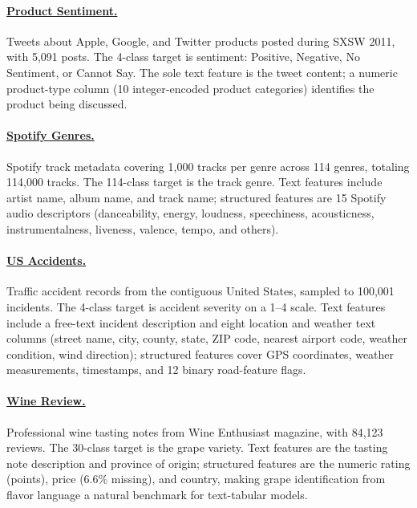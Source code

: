 \documentclass{llmxive}
\begin{document}
\paragraph{\href{https://www.openml.org/search?type=data&id=46651}{Product Sentiment.}} Tweets about Apple, Google, and Twitter products posted during SXSW 2011, with 5,091 posts.
The 4-class target is sentiment: Positive, Negative, No Sentiment, or Cannot Say.
The sole text feature is the tweet content; a numeric product-type column (10 integer-encoded product categories) identifies the product being discussed.

\paragraph{\href{https://www.kaggle.com/datasets/maharshipandya/-spotify-tracks-dataset}{Spotify Genres.}} Spotify track metadata covering 1,000 tracks per genre across 114 genres, totaling 114,000 tracks.
The 114-class target is the track genre.
Text features include artist name, album name, and track name; structured features are 15 Spotify audio descriptors (danceability, energy, loudness, speechiness, acousticness, instrumentalness, liveness, valence, tempo, and others).

\paragraph{\href{https://www.kaggle.com/datasets/sobhanmoosavi/us-accidents}{US Accidents.}}
Traffic accident records from the contiguous United States, sampled to 100,001 incidents.
The 4-class target is accident severity on a 1--4 scale.
Text features include a free-text incident description and eight location and weather text columns (street name, city, county, state, ZIP code, nearest airport code, weather condition, wind direction); structured features cover GPS coordinates, weather measurements, timestamps, and 12 binary road-feature flags.

\paragraph{\href{https://www.openml.org/search?type=data&id=46653}{Wine Review.}}
Professional wine tasting notes from Wine Enthusiast magazine, with 84,123 reviews.
The 30-class target is the grape variety.
Text features are the tasting note description and province of origin; structured features are the numeric rating (points), price (6.6\% missing), and country, making grape identification from flavor language a natural benchmark for text-tabular models.
\end{document}
